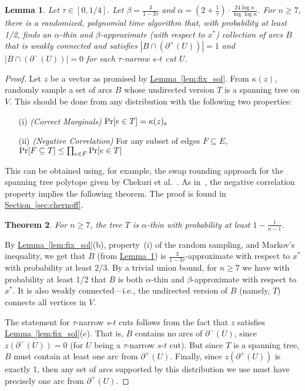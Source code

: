 \documentclass[11pt]{article}
\newcommand{\lref}[2][]{\hyperref[#2]{#1~\ref*{#2}}}
\newtheorem{theorem}{Theorem}[section]
\newtheorem{lemma}[theorem]{Lemma}
\theoremstyle{definition}
\def\A{{B}}
\def\Pr{{\rm Pr}}
\begin{document}
\begin{lemma} \label{lem:findtree}
  Let $\tau \in [0, 1/4]$. Let $\beta = \frac{3}{1-3\tau}$ and $\alpha =
  \left(2 + \frac{1}{\tau}\right)\cdot \frac{24 \log n}{\log\log n}$.
For $n \geq 7$, there is a randomized,
  polynomial time algorithm that, with probability at least 1/2, finds
  an $\alpha$-thin and $\beta$-approximate (with respect to $x^*$)
  collection of arcs $\A$ that is weakly connected and satisfies $|\A
  \cap (\partial^+(U))| = 1$ and $|\A \cap (\partial^-(U))| = 0$ for each
  $\tau$-narrow $s$-$t$ cut $U$.
\end{lemma}
\begin{proof}
  Let $z$ be a vector as promised by \lref[Lemma]{lem:fix_sol}. From
  $\kappa(z)$, randomly sample a set of arcs $\A$ whose undirected
  version $T$ is a spanning tree on $V$. This should be done
  from any distribution with the following two properties:
  \begin{itemize}
  \item[(i)] \emph{(Correct Marginals)} $\Pr[e \in T] = \kappa(z)_e$
  \item[(ii)] \emph{(Negative Correlation)} For any subset of edges $F \subseteq E$, $\Pr[F \subseteq
    T] \leq \prod_{e \in F} \Pr[e \in T]$
  \end{itemize}
  This can be obtained using, for example, the swap rounding approach
  for the spanning tree polytope given by Chekuri et al.~\cite{CVZ10}.
  As in~\cite{AGMSS}, the negative correlation property implies the following
  theorem. The proof is found in \lref[Section]{sec:chernoff}.
  \begin{theorem}\label{thm:chernoff}
  For $n \geq 7$, the tree $T$ is $\alpha$-thin with probability at least $1 - \frac{1}{n-1}$.
  \end{theorem}

  By \lref[Lemma]{lem:fix_sol}(b), property~(i) of the random sampling,
  and Markov's inequality, we get that $\A$ (from \lref[Lemma]{lem:findtree}) is
  $\frac{3}{1-3\tau}$-approximate with respect to $x^*$ with probability
  at least 2/3. By a trivial union bound, for $n \geq 7$ we have
  with probability at least 1/2 that $\A$ is both $\alpha$-thin and $\beta$-approximate with
  respect to $x^*$. It is also weakly connected---i.e., the undirected
  version of $\A$ (namely, $T$) connects all vertices in $V$.

  The statement for $\tau$-narrow $s$-$t$ cuts follows from the fact
  that $z$ satisfies \lref[Lemma]{lem:fix_sol}(c). That is, $\A$ contains
  no arcs of $\partial^-(U)$, since $z(\partial^-(U)) = 0$ (for $U$ being a
  $\tau$-narrow $s$-$t$ cut). But since $T$ is a spanning tree,
  $\A$ must contain at least one arc from $\partial^+(U)$. Finally, since
  $z(\partial^+(U))$ is exactly 1, then any set of arcs supported by this
  distribution we use must have precisely one arc from $\partial^+(U)$.
\end{proof}
\end{document}

